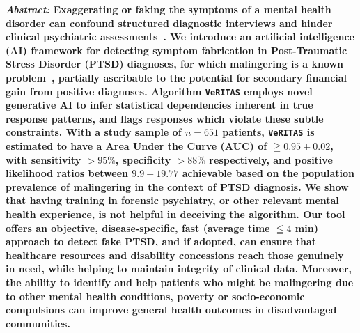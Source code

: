 \documentclass[onecolumn,10pt]{IEEEtran}
\def\vrts{\texttt{VeRITAS}\xspace}
\begin{document}
\maketitle

{\bf \sffamily \fontsize{10}{12}\selectfont \noindent   
  {\normalfont \itshape Abstract:} Exaggerating or faking  the symptoms of a mental health disorder  can confound structured diagnostic interviews and hinder clinical psychiatric assessments~\cite{Rogers1997,rogers2008clinical}.  We introduce an  artificial intelligence (AI) framework for detecting symptom fabrication in Post-Traumatic Stress Disorder (PTSD) diagnoses, for which malingering is a known problem~\cite{frueh2007us,taylor2007detection}, partially ascribable to the  potential for secondary financial gain from positive diagnoses.  Algorithm \vrts employs novel generative AI to infer statistical dependencies inherent in true response patterns, and flags  responses which violate these subtle  constraints.  With a study sample of $n=651$ patients, \vrts is estimated to have a   Area Under the Curve (AUC) of $\geqq 0.95\pm 0.02$, with  sensitivity $>95\%$, specificity $>88\%$ respectively, and positive likelihood ratios between $9.9 - 19.77$ achievable based on the population prevalence of malingering in the context of PTSD diagnosis. We show that having training in forensic psychiatry, or other relevant mental health experience, is not helpful in deceiving  the algorithm. Our tool   offers an  objective, disease-specific, fast (average time $\leqq 4$ min)  approach to detect fake  PTSD, and if adopted, can  ensure that healthcare resources and disability concessions reach  those genuinely in need,  while  helping to maintain  integrity of clinical data. Moreover, the ability to identify and help  patients who might be malingering due to other mental health conditions, poverty or   socio-economic compulsions can  improve general health outcomes  in disadvantaged communities.  
}

\vspace{10pt} 
\end{document}
